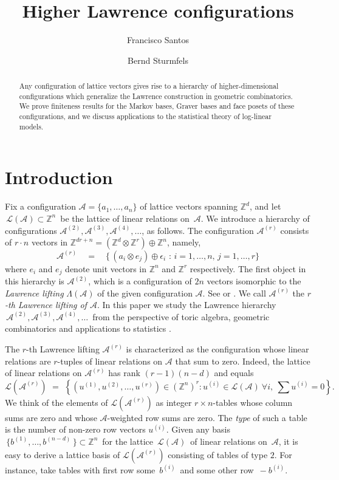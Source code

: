 \documentclass[11pt]{amsart}
\title{  Higher Lawrence configurations}
\author{     Francisco Santos}
\author{     Bernd Sturmfels}
\theoremstyle{definition}
\newcommand{\integers}{{\mathbb Z}}
\newcommand{\e}{{\epsilon}}
\renewcommand{\L}{{\mathcal L}}
\newcommand{\A}{{\mathcal A}}
\begin{document}
  \begin{abstract}
Any configuration of lattice vectors gives rise to
a hierarchy of higher-dimensional configurations
which generalize the  Lawrence construction
in geometric combinatorics. We prove finiteness
results for the Markov bases, Graver bases and
face posets of these configurations, and we discuss
applications to the statistical theory of log-linear models.


  \end{abstract}

  \maketitle

  \section{\bf Introduction}
Fix a configuration $\A=\{a_1,\dots,a_n\}$ of lattice vectors  
spanning $\integers^d$,  and let $\,\L(\A)\subset \integers^n\,$ be
the lattice of linear relations on
$\,\A$. We introduce a
  hierarchy of configurations $\A^{(2)}, \A^{(3)}, \A^{(4)}, \dots$, as  
follows.
  The configuration
  $\A^{(r)}$ consists of $r\cdot n$ vectors in $\integers^{dr+n}=
  (\integers^{d}\otimes\integers^{r})\oplus\integers^{n}$, namely,
  \begin{equation}
  \A^{(r)}
\quad = \quad \bigl\{ \,
(a_i\otimes e_j) \oplus \e_i \,\,: \,i=1,\dots, n,\, j=1,\ldots,r  
\bigr\}
  \label{eqn:Ar}
  \end{equation}
  where $e_i$ and $e_j$ denote unit
vectors in $\integers^n$ and $\integers^r$ respectively.
The first object in this hierarchy is  $\A^{(2)}$,  which is
a configuration of $2n$ vectors isomorphic to the  \emph{Lawrence  
lifting}
$\Lambda(\A)$ of the given configuration  $\A$. See
\cite[\S 7]{Sturmfels-book} or \cite[\S 6.6]{Ziegler}.
  We call $\A^{(r)}$ the \emph{$r$-th Lawrence lifting of $\A$}.
In this paper we study the  Lawrence hierarchy $\,\A^{(2)}, \A^{(3)},
  \A^{(4)}, \dots \,$ from the perspective of toric algebra,
geometric combinatorics and applications to statistics \cite{Diaconis}.

The $r$-th Lawrence lifting  $\A^{(r)}$ is characterized as the
configuration whose linear relations are $r$-tuples of
linear relations on $\A$  that sum to zero. Indeed,
the lattice of linear relations on $\A^{(r)}$
has rank $(r-1)(n-d)$ and equals
$$
  \L(\A^{(r)}) \,\, = \,\,
  \left\{     (u^{(1)} \! , u^{(2)} \!, \dots, u^{(r)}) \in  
(\integers^n)^r
      :
      u^{(i)} \in \L(\A)\ \forall i,\  \sum u^{(i)}=0   \right\}.
$$
We think of the elements of $\L(\A^{(r)})$ as integer
  $r\times n$-tables whose column sums are zero and whose $\A$-weighted
row sums are zero. The \emph{type} of such a table
is the number of non-zero row  vectors $u^{(i)}$.
  Given any basis $\,\{b^{(1)}, \dots, b^{(n-d)}\,\}
\subset \integers^n\,$ for the lattice $\,\L(\A)\,$ of linear relations
on $\,\A$,  it is easy to derive a lattice basis of $\L(\A^{(r)})$
consisting of tables of type $2$. For instance, take tables with first  
row
some $\, b^{(i)}\,$ and some other row $\,-b^{(i)}$.
\end{document}
